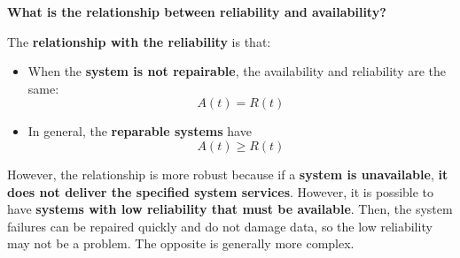 \highspace
\begin{flushleft}
    \textcolor{Green3}{ \textbf{What is the relationship between reliability and availability?}}
\end{flushleft}
The \textbf{relationship with the reliability} is that:
\begin{itemize}
    \item When the \textbf{system is not repairable}, the availability and reliability are the same:
    \begin{equation}
        A\left(t\right) = R\left(t\right)
    \end{equation}

    \item In general, the \textbf{reparable systems} have
    \begin{equation}
        A\left(t\right) \ge R\left(t\right)
    \end{equation}
\end{itemize}
However, the relationship is more robust because if a \textbf{system is unavailable}, \textbf{it does not deliver the specified system services}. However, it is possible to have \textbf{systems with low reliability that must be available}. Then, the system failures can be repaired quickly and do not damage data, so the low reliability may not be a problem. The opposite is generally more complex.

\newpage


